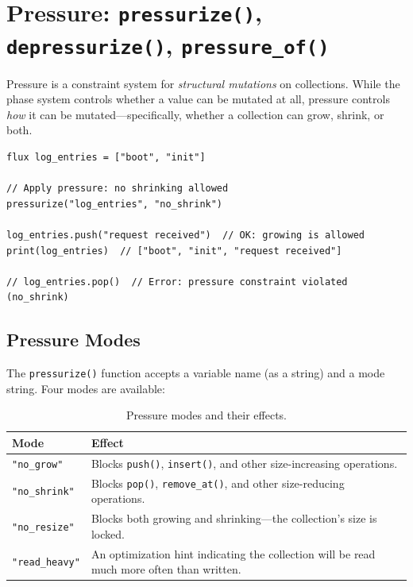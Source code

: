 
\section{Pressure: \texttt{pressurize()}, \texttt{depressurize()}, \texttt{pressure\_of()}}\label{sec:pressure}


Pressure is a constraint system for \emph{structural mutations} on collections.
While the phase system controls whether a value can be mutated at all, pressure controls \emph{how} it can be mutated---specifically, whether a collection can grow, shrink, or both.

\begin{lstlisting}[language=Lattice, caption={Applying pressure constraints}]
flux log_entries = ["boot", "init"]

// Apply pressure: no shrinking allowed
pressurize("log_entries", "no_shrink")

log_entries.push("request received")  // OK: growing is allowed
print(log_entries)  // ["boot", "init", "request received"]

// log_entries.pop()  // Error: pressure constraint violated (no_shrink)
\end{lstlisting}

\subsection{Pressure Modes}

The \lstinline|pressurize()| function accepts a variable name (as a string) and a mode string.
Four modes are available:

\begin{table}[h]
\centering
\begin{tabular}{lp{8cm}}
\toprule
\textbf{Mode} & \textbf{Effect} \\
\midrule
\lstinline|"no_grow"| & Blocks \lstinline|push()|, \lstinline|insert()|, and other size-increasing operations. \\
\lstinline|"no_shrink"| & Blocks \lstinline|pop()|, \lstinline|remove_at()|, and other size-reducing operations. \\
\lstinline|"no_resize"| & Blocks both growing and shrinking---the collection's size is locked. \\
\lstinline|"read_heavy"| & An optimization hint indicating the collection will be read much more often than written. \\
\bottomrule
\end{tabular}
\caption{Pressure modes and their effects.}\label{tab:pressure-modes}
\end{table}

